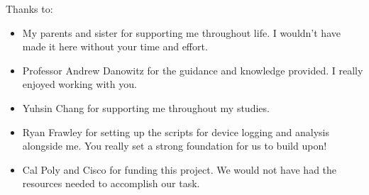 \noindent
Thanks to:
\begin{itemize}
    \item My parents and sister for supporting me throughout life. I wouldn't have made it here without your time and effort.
    \item Professor Andrew Danowitz for the guidance and knowledge provided. I really enjoyed working with you.
    \item Yuhsin Chang for supporting me throughout my studies.
    \item Ryan Frawley for setting up the scripts for device logging and analysis alongside me. You really set a strong foundation for us to build upon!
    \item Cal Poly and Cisco for funding this project. We would not have had the resources needed to accomplish our task.
\end{itemize}
